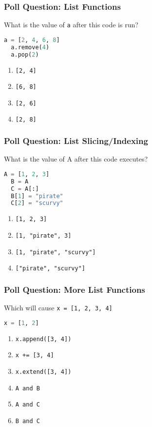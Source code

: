 \documentclass{beamer}
\begin{document}
%
%
\begin{frame}[fragile]
  \frametitle{Poll Question: List Functions}
  What is the value of \lstinline|a| after this code is run?
  \begin{lstlisting}[language=Python, autogobble]
  a = [2, 4, 6, 8]
  a.remove(4)
  a.pop(2)
  \end{lstlisting}
  \vfill
  \begin{enumerate}[A]
    \item \lstinline|[2, 4]|
    \item \lstinline|[6, 8]|
    \item \lstinline|[2, 6]|
    \item \lstinline|[2, 8]|
  \end{enumerate}
\end{frame}

%
%
\begin{frame}[fragile]
  \frametitle{Poll Question: List Slicing/Indexing}
  What is the value of A after this code executes?
  \begin{lstlisting}[language=Python, autogobble]
  A = [1, 2, 3]
  B = A
  C = A[:]
  B[1] = "pirate"
  C[2] = "scurvy"
  \end{lstlisting}
  \vfill
  \begin{enumerate}[A]
    \item \lstinline|[1, 2, 3]|
    \item \lstinline|[1, "pirate", 3]|
    \item \lstinline|[1, "pirate", "scurvy"]|
    \item \lstinline|["pirate", "scurvy"]|
  \end{enumerate}
\end{frame}

%
%
\begin{frame}[fragile]
  \frametitle{Poll Question: More List Functions}
  Which will cause \lstinline|x = [1, 2, 3, 4]|
  \begin{lstlisting}[language=Python, autogobble]
  x = [1, 2]
  \end{lstlisting}
  \vfill
  \begin{enumerate}[A]
    \item \lstinline|x.append([3, 4])|
    \item \lstinline|x += [3, 4]|
    \item \lstinline|x.extend([3, 4])|
    \item \lstinline|A and B|
    \item \lstinline|A and C|
    \item \lstinline|B and C|
  \end{enumerate}
\end{frame}
\end{document}

